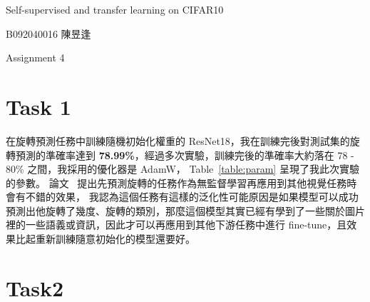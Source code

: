 \documentclass[a4paper,12pt]{article}   %
\begin{document}

\begin{center}
	{\fontsize{16pt}{12pt}\selectfont Self-supervised and transfer learning on CIFAR10}
	
\end{center}

\hfill  B092040016 陳昱逢
	
	
\begin{center}
	Assignment 4
\end{center}

\section{Task 1}
	在旋轉預測任務中訓練隨機初始化權重的 ResNet18，我在訓練完後對測試集的旋轉預測的準確率達到 \textbf{78.99\%}，經過多次實驗，訓練完後的準確率大約落在 78 - 80\% 之間，我採用的優化器是 AdamW， Table\ \ref{table:param} 呈現了我此次實驗的參數。 論文\ \cite{gidaris2018unsupervised} 提出先預測旋轉的任務作為無監督學習再應用到其他視覺任務時會有不錯的效果， 我認為這個任務有這樣的泛化性可能原因是如果模型可以成功預測出他旋轉了幾度、旋轉的類別，那麼這個模型其實已經有學到了一些關於圖片裡的一些語義或資訊，因此才可以再應用到其他下游任務中進行 fine-tune，且效果比起重新訓練隨意初始化的模型還要好。
	
	
\begin{table}[htb]
	\centering	
	\normalsize
    \newcommand{\z}{\phantom{0}}
    \caption{configurations of my experiment}
    \vspace{0.15\baselineskip}
	\label{table:param}
   \vspace{0.1\baselineskip}
\end{table}



\section{Task2}
\end{document}
